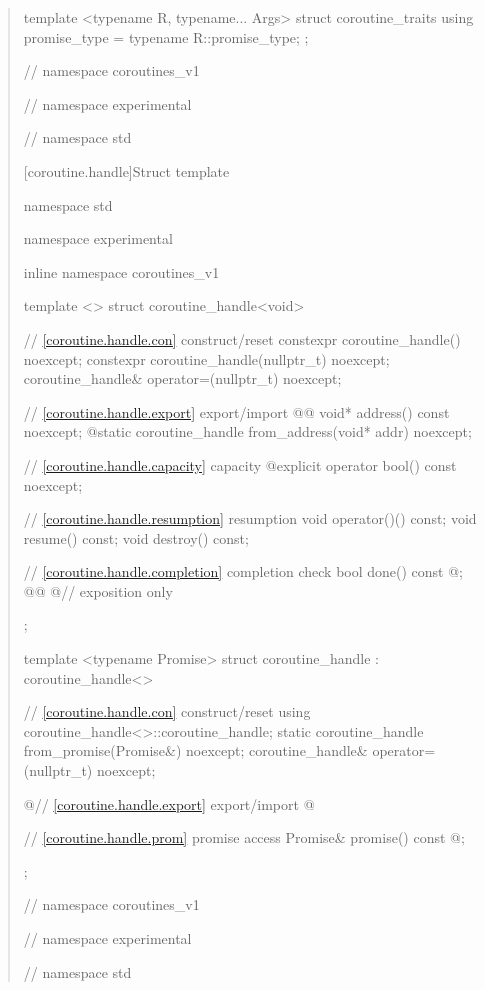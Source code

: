 \begin{quote}
\begin{removedblock}
\begin{codeblock}
{{{  template <typename R, typename... Args>
  struct coroutine_traits {
    using promise_type = typename R::promise_type;
  };

} // namespace coroutines_v1
} // namespace experimental
} // namespace std
\end{codeblock}
\end{removedblock}
\cbend

[coroutine.handle]{Struct template }

%
\begin{codeblock}
namespace std {
namespace experimental {
inline namespace coroutines_v1 {

  template <>
  struct coroutine_handle<void>
  {
    // \ref{coroutine.handle.con} construct/reset
    constexpr coroutine_handle() noexcept;		
    constexpr coroutine_handle(nullptr_t) noexcept;
    coroutine_handle& operator=(nullptr_t) noexcept;
    
    // \ref{coroutine.handle.export} export/import
    @\cbstart{}@ void* address() const noexcept;
    @\cbend@ static coroutine_handle from_address(void* addr) noexcept;		
    
    // \ref{coroutine.handle.capacity} capacity
    @\cbstart{}\cbend@ explicit operator bool() const noexcept;
    
    // \ref{coroutine.handle.resumption} resumption
    void operator()() const;
    void resume() const;	
    void destroy() const;
    
    // \ref{coroutine.handle.completion} completion check
    bool done() const @\cbstart{}\cbend@; 
  @\cbstart{}@
    @\cbend@ // exposition only
  };

  template <typename Promise>
  struct coroutine_handle : coroutine_handle<>
  {
    // \ref{coroutine.handle.con} construct/reset
    using coroutine_handle<>::coroutine_handle;
    static coroutine_handle from_promise(Promise&) noexcept;		
    coroutine_handle& operator=(nullptr_t) noexcept;

    @\cbstart@// \ref{coroutine.handle.export} export/import
    @\cbend@
    
    // \ref{coroutine.handle.prom} promise access
    Promise& promise() const @\cbstart{}\cbend@;		
  };

} // namespace coroutines_v1
} // namespace experimental
} // namespace std
\end{codeblock}


\end{quote}
